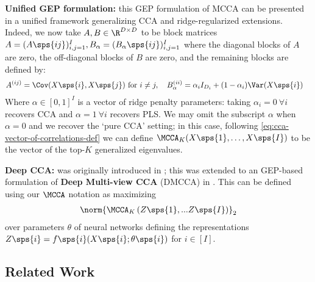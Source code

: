 \textbf{Unified GEP formulation:}
this GEP formulation of MCCA can be presented in a unified framework generalizing CCA and ridge-regularized extensions. Indeed, we now take $A,B \in \R^{D \times D}$ to be block matrices $A = (A\sps{ij})_{i,j=1}^I, B_\alpha = (B_\alpha\sps{ij})_{i,j=1}^I$ where the diagonal blocks of $A$ are zero, the off-diagonal blocks of $B$ are zero, and the remaining blocks are defined by:
\begin{align}\label{eq:gep-most-general-formulation}%
    A^{(ij)} &= \Cov(X\sps{i}, X\sps{j}) \text{ for } i \neq j, \quad %
    B_\alpha^{(ii)} = \alpha_i I_{D_i} + (1-\alpha_i) \Var(X\sps{i})  %
\end{align}
Where $\alpha \in [0,1]^I$ is a vector of ridge penalty parameters: taking $\alpha_i = 0 \: \forall i$ recovers CCA and $\alpha = 1 \: \forall i$ recovers PLS.
We may omit the subscript $\alpha$ when $\alpha=0$ and we recover the `pure CCA' setting; in this case, following \cref{eq:cca-vector-of-correlations-def} we can define $\MCCA_K(X\sps{1},\dots,X\sps{I})$ to be the vector of the top-$K$ generalized eigenvalues.


\textbf{Deep CCA:} was originally introduced in \cite{andrew2013deep}; this was extended to an GEP-based formulation of \textbf{Deep Multi-view CCA} (DMCCA) in \cite{somandepalli2019multimodal}. This can be defined using our $\MCCA$ notation as maximizing
\begin{align}\label{eq:DMCCA-def}
    \norm{\MCCA_K\left(Z\sps{1}, ... Z\sps{I}\right)}_2
\end{align}
over parameters $\theta$ of neural networks defining the representations $Z\sps{i}=f\sps{i}(X\sps{i};\theta\sps{i})$ for $i\in[I]$.

\subsection{Related Work}

